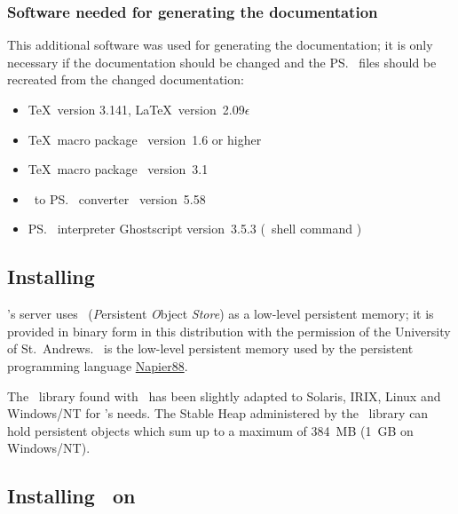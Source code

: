 \subsubsection[Generating the documentation]
{Software needed for generating the documentation}

This additional software was used for generating the documentation; it
is only necessary if the documentation should be changed and the
\ps\ files should be recreated from the changed documentation:

\begin{itemize}

\item \TeX\ version 3.141, \LaTeX\ version~2.09$\epsilon$

\item \TeX\ macro package \ version~1.6 or higher

\item \TeX\ macro package \ version~3.1

\item {}\ to \ps\ converter \ version~5.58

\item \ps\ interpreter Ghostscript version~3.5.3 (\unix\ shell
command )

\end{itemize}

\subsection[Installing POSTORE]%
{Installing \protect\postore}\label{sec:postore}

\plob's server uses \postore\ (\textit{P}ersistent \textit{O}bject
\textit{Store}) as a low-level persistent memory; it is provided in
binary form in this distribution with the permission of the University
of St.\ Andrews.  \postore\ is the low-level persistent memory used by
the persistent programming language
\href{http://www-ppg.dcs.st-andrews.ac.uk/Default.html}{Napier88}.

The \postore\ library found with \plob\ has been slightly adapted to
Solaris, IRIX, Linux and Windows/NT for \plob's needs. The Stable Heap
administered by the \postore\ library can hold persistent objects
which sum up to a maximum of 384~MB (1~GB on Windows/NT).

\subsection[Installing PLOB on Unix]%
{Installing \protect\plob\ on \protect\unix}%
\label{sec:install}

